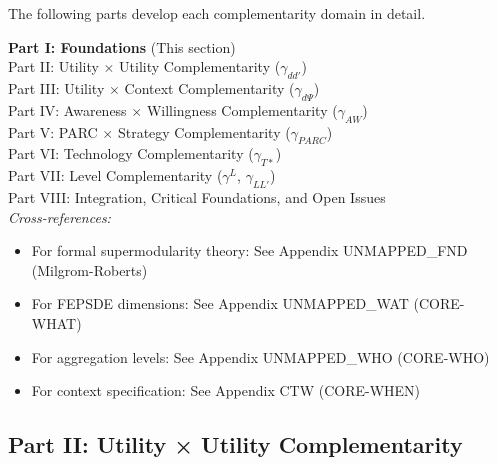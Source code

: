 The following parts develop each complementarity domain in detail.


\vspace{1cm}
\begin{tcolorbox}[colback=gray!10, colframe=gray!50, title=Appendix UNMAPPED_HOW Structure]
\textbf{Part I: Foundations} (This section) \\
Part II: Utility $\times$ Utility Complementarity ($\gamma_{dd'}$) \\
Part III: Utility $\times$ Context Complementarity ($\gamma_{d\Psi}$) \\
Part IV: Awareness $\times$ Willingness Complementarity ($\gamma_{AW}$) \\
Part V: PARC $\times$ Strategy Complementarity ($\gamma_{PARC}$) \\
Part VI: Technology Complementarity ($\gamma_{T*}$) \\
Part VII: Level Complementarity ($\gamma^L$, $\gamma_{LL'}$) \\
Part VIII: Integration, Critical Foundations, and Open Issues \\

\vspace{0.3cm}
\textit{Cross-references:}
\begin{itemize}
    \item For formal supermodularity theory: See Appendix UNMAPPED_FND (Milgrom-Roberts)
    \item For FEPSDE dimensions: See Appendix UNMAPPED_WAT (CORE-WHAT)
    \item For aggregation levels: See Appendix UNMAPPED_WHO (CORE-WHO)
    \item For context specification: See Appendix CTW (CORE-WHEN)
\end{itemize}
\end{tcolorbox}



\subsection{Part II: Utility × Utility Complementarity}
\label{sec:B-utility-utility}

